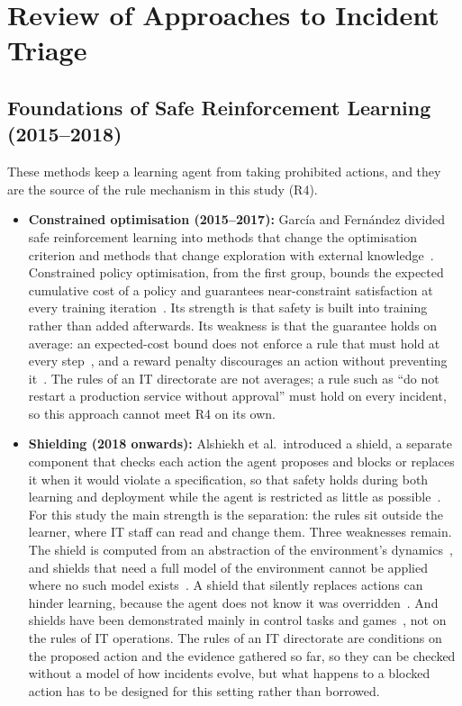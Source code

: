 \section{Review of Approaches to Incident Triage}
\label{ch02:sec:review}

\subsection{Foundations of Safe Reinforcement Learning (2015--2018)}

These methods keep a learning agent from taking prohibited actions, and they are the source of the rule mechanism in this study (R4).

\begin{itemize}
\item \textbf{Constrained optimisation (2015--2017):} García and Fernández divided safe reinforcement learning into methods that change the optimisation criterion and methods that change exploration with external knowledge~\cite{garcia2015}. Constrained policy optimisation, from the first group, bounds the expected cumulative cost of a policy and guarantees near-constraint satisfaction at every training iteration~\cite{achiam2017}. Its strength is that safety is built into training rather than added afterwards. Its weakness is that the guarantee holds on average: an expected-cost bound does not enforce a rule that must hold at every step~\cite{zhao2023}, and a reward penalty discourages an action without preventing it~\cite{konighofer2025}. The rules of an IT directorate are not averages; a rule such as ``do not restart a production service without approval'' must hold on every incident, so this approach cannot meet R4 on its own.

\item \textbf{Shielding (2018 onwards):} Alshiekh et al.\ introduced a shield, a separate component that checks each action the agent proposes and blocks or replaces it when it would violate a specification, so that safety holds during both learning and deployment while the agent is restricted as little as possible~\cite{alshiekh2018}. For this study the main strength is the separation: the rules sit outside the learner, where IT staff can read and change them. Three weaknesses remain. The shield is computed from an abstraction of the environment's dynamics~\cite{alshiekh2018}, and shields that need a full model of the environment cannot be applied where no such model exists~\cite{yang2023}. A shield that silently replaces actions can hinder learning, because the agent does not know it was overridden~\cite{yang2023}. And shields have been demonstrated mainly in control tasks and games~\cite{alshiekh2018,konighofer2025}, not on the rules of IT operations. The rules of an IT directorate are conditions on the proposed action and the evidence gathered so far, so they can be checked without a model of how incidents evolve, but what happens to a blocked action has to be designed for this setting rather than borrowed.
\end{itemize}

